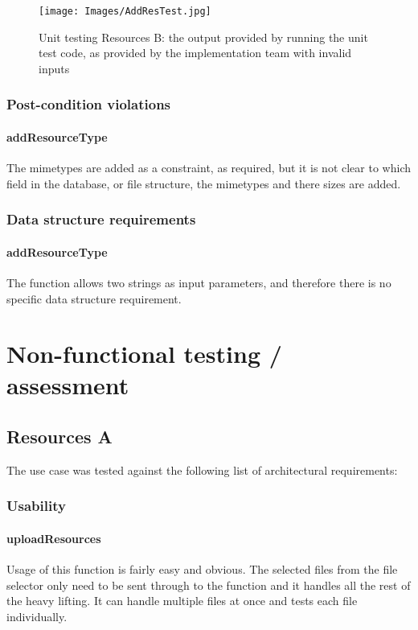 \documentclass[a4paper]{article}
\begin{document}
\begin{figure}[G]
\texttt{[image: Images/AddResTest.jpg]}
\caption{Unit testing Resources B: the output provided by running the unit test code, as provided by the implementation team with invalid inputs \label{overflow}}
\end{figure}

\subsubsection {Post-condition violations}

\paragraph{addResourceType}
The mimetypes are added as a constraint, as required, but it is not clear to which field in the database, or file structure, the mimetypes and there sizes are added.

\subsubsection {Data structure requirements}
\paragraph{addResourceType}
The function allows two strings as input parameters, and therefore there is no specific data structure requirement.




\section {Non-functional testing / assessment}
\subsection {Resources A}
The use case was tested against the following list of architectural requirements:
\subsubsection {Usability}

\paragraph{uploadResources}
Usage of this function is fairly easy and obvious. The selected files from the file selector only need to be sent through to the function and it handles all the rest of the heavy lifting. It can handle multiple files at once and tests each file individually.
\end{document}
